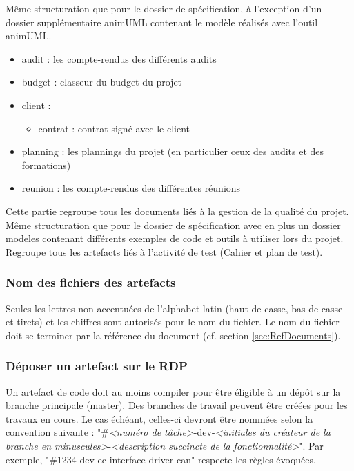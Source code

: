 \documentclass[a4paper,11pt,titlepage]{article}
\newcounter{subsubsubsection}[subsubsection]
\begin{document}
Même structuration que pour le dossier de spécification, à l'exception d'un dossier 
supplémentaire animUML contenant le modèle réalisés avec l'outil animUML.

\begin{itemize}
    \item audit : les compte-rendus des différents audits
    \item budget : classeur du budget du projet
    \item client :
    \begin{itemize}
        \item contrat : contrat signé avec le client
    \end{itemize}
    \item planning : les plannings du projet (en particulier ceux des audits et des formations)
    \item reunion : les compte-rendus des différentes réunions
\end{itemize}

Cette partie regroupe tous les documents liés à la gestion de la qualité du projet.
Même structuration que pour le dossier de spécification avec en plus un dossier modeles contenant
différents exemples de code et outils à utiliser lors du projet. \\

Regroupe tous les artefacts liés à l'activité de
test (Cahier et plan de test).

\subsubsection{Nom des fichiers des artefacts}
Seules les lettres non accentuées de l'alphabet latin
(haut de casse, bas de casse et tirets) et les chiffres sont autorisés pour
le nom du fichier. Le nom du fichier doit se terminer par la
référence du document (cf. section \ref{sec:RefDocuments}).

\subsubsection{Déposer un artefact sur le RDP} \label{sec:DepotRDP}
Un artefact de code doit au moins compiler pour être éligible à un
dépôt sur la branche principale (master). Des branches de travail peuvent être créées pour
les travaux en cours. Le cas échéant, celles-ci devront être nommées selon la convention 
suivante : "\#\emph{<numéro de tâche>}-dev-\emph{<initiales du créateur de la branche en minuscules>}-\emph{<description succincte de la fonctionnalité>}". Par exemple, "\#1234-dev-ec-interface-driver-can" respecte les règles évoquées.\\
\end{document}
